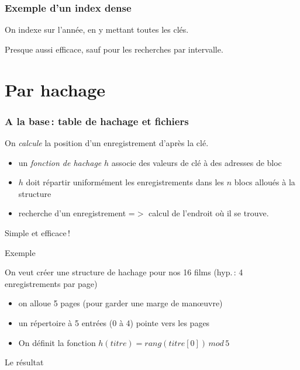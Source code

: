 \begin{frame}
\frametitle{Exemple d'un index dense}

On indexe sur l'année, en y mettant \alert{toutes} les clés.


Presque aussi efficace, sauf pour les recherches par intervalle.
\end{frame}


\section{Par hachage}


\begin{frame}
\frametitle{A la base\,: table de hachage et fichiers}

On \textit{calcule} la position d'un enregistrement
d'après la clé.
\begin{itemize}
  \item un \textit{fonction de hachage} $h$ associe des
         valeurs de clé à des adresses de bloc
   \item $h$ doit répartir uniformément les enregistrements
            dans les $n$ blocs alloués à la structure
  \item recherche d'un enregistrement =$>$ calcul de l'endroit
          où il se trouve.
\end{itemize}
Simple et efficace\,!
\end{frame}


\begin{frame}{Exemple}

On veut créer une structure de hachage pour nos 16 films
(hyp.\,: 4 enregistrements   par page)
\begin{itemize}
  \item on alloue 5 pages (pour garder une marge de man{\oe}uvre)
  \item un répertoire à 5 entrées (0 à 4) pointe vers les pages
   \item On définit la fonction $h(titre) = rang(titre[0])\, mod\, 5$
\end{itemize}

\end{frame}

\begin{frame}{Le résultat}


\end{frame}


